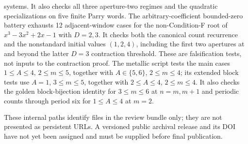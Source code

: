 systems.  It also checks all three aperture-two regimes and the quadratic
specializations on five finite Parry words.
The arbitrary-coefficient bounded-zero battery exhausts 12 adjacent-window
cases for the non-Condition-F root of $x^3-3x^2+2x-1$ with $D=2,3$.
It checks both the canonical count recurrence and the nonstandard initial
values $(1,2,4)$, including the first two apertures at and beyond the latter
$D=3$ contraction threshold.  These are falsification tests, not inputs to
the contraction proof.
The metallic
script tests the main cases $1\le A\le4$, $2\le m\le5$, together with
$A\in\{5,6\}$, $2\le m\le4$; its extended block tests use $A=1$,
$3\le m\le5$, together with $2\le A\le4$, $2\le m\le4$.  It also checks
the golden block-bijection identity for $3\le m\le6$ at $n=m,m+1$ and
periodic counts through period six for $1\le A\le4$ at $m=2$.

These internal paths identify files in the review bundle only; they are not
presented as persistent URLs.  A versioned public archival release and its DOI
have not yet been assigned and must be supplied before final publication.
